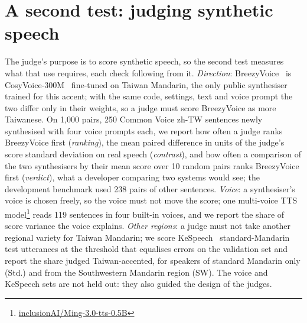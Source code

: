 \documentclass{Interspeech}
\begin{document}
\section{A second test: judging synthetic speech}
\label{sec:second}

The judge's purpose is to score synthetic speech, so the second test measures what that use requires, each check following from it. \emph{Direction}: BreezyVoice~\cite{hsu2025breezyvoice} is CosyVoice-300M~\cite{du2024cosyvoice} fine-tuned on Taiwan Mandarin, the only public synthesiser trained for this accent; with the same code, settings, text and voice prompt the two differ only in their weights, so a judge must score BreezyVoice as more Taiwanese. On 1,000 pairs, 250 Common Voice zh-TW sentences newly synthesised with four voice prompts each, we report how often a judge ranks BreezyVoice first (\emph{ranking}), the mean paired difference in units of the judge's score standard deviation on real speech (\emph{contrast}), and how often a comparison of the two synthesisers by their mean score over 10 random pairs ranks BreezyVoice first (\emph{verdict}), what a developer comparing two systems would see; the development benchmark used 238 pairs of other sentences. \emph{Voice}: a synthesiser's voice is chosen freely, so the voice must not move the score; one multi-voice TTS model\footnote{\url{inclusionAI/Ming-3.0-tts-0.5B}} reads 119 sentences in four built-in voices, and we report the share of score variance the voice explains. \emph{Other regions}: a judge must not take another regional variety for Taiwan Mandarin; we score KeSpeech~\cite{tang2021kespeech} standard-Mandarin test utterances at the threshold that equalises errors on the validation set and report the share judged Taiwan-accented, for speakers of standard Mandarin only (Std.) and from the Southwestern Mandarin region (SW). The voice and KeSpeech sets are not held out: they also guided the design of the judges.
\end{document}
